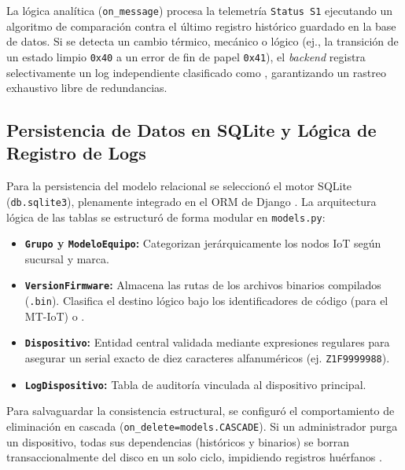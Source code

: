 \par La lógica analítica (\texttt{on\_message}) procesa la telemetría \texttt{Status S1} ejecutando un algoritmo de comparación contra el último registro histórico guardado en la base de datos. Si se detecta un cambio térmico, mecánico o lógico (ej., la transición de un estado limpio \texttt{0x40} a un error de fin de papel \texttt{0x41}), el \textit{backend} registra selectivamente un log independiente clasificado como , garantizando un rastreo exhaustivo libre de redundancias.

\subsection{Persistencia de Datos en SQLite y Lógica de Registro de Logs}

\par Para la persistencia del modelo relacional se seleccionó el motor SQLite (\texttt{db.sqlite3}), plenamente integrado en el ORM de Django \cite{Django_v5_Doc}. La arquitectura lógica de las tablas se estructuró de forma modular en \texttt{models.py}:

\begin{itemize} 
    \item \textbf{\texttt{Grupo} y \texttt{ModeloEquipo}:} Categorizan jerárquicamente los nodos IoT según sucursal y marca. 
    \item \textbf{\texttt{VersionFirmware}:} Almacena las rutas de los archivos binarios compilados (\texttt{.bin}). Clasifica el destino lógico bajo los identificadores de código  (para el MT-IoT) o .
    \item \textbf{\texttt{Dispositivo}:} Entidad central validada mediante expresiones regulares para asegurar un serial exacto de diez caracteres alfanuméricos (ej. \texttt{Z1F9999988}).
    \item \textbf{\texttt{LogDispositivo}:} Tabla de auditoría vinculada al dispositivo principal.
\end{itemize}

\par Para salvaguardar la consistencia estructural, se configuró el comportamiento de eliminación en cascada (\texttt{on\_delete=models.CASCADE}). Si un administrador purga un dispositivo, todas sus dependencias (históricos y binarios) se borran transaccionalmente del disco en un solo ciclo, impidiendo registros huérfanos \cite{Django_v5_Doc}.\\

